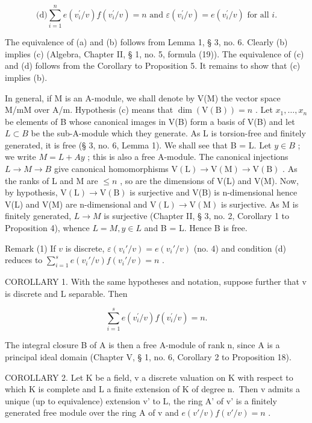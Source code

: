 \[
\text {(d)} \sum_ {i = 1} ^ {n} e (v _ {i} ^ {\prime} / v) f (v _ {i} ^ {\prime} / v) = n \text { and } \varepsilon (v _ {i} ^ {\prime} / v) = e (v _ {i} ^ {\prime} / v) \text { for   all } i.
\]

The equivalence of (a) and (b) follows from Lemma 1, § 3, no. 6. Clearly (b) implies (c) (Algebra, Chapter II, § 1, no. 5, formula (19)). The equivalence of (c) and (d) follows from the Corollary to Proposition 5. It remains to show that (c) implies (b).

In general, if M is an A-module, we shall denote by V(M) the vector space M/mM over A/m. Hypothesis (c) means that \(\dim(\mathrm{V}(\mathrm{B})) = n\) . Let \(x_{1}, \ldots, x_{n}\) be elements of B whose canonical images in V(B) form a basis of V(B) and let \(L \subset B\) be the sub-A-module which they generate. As L is torsion-free and finitely generated, it is free (§ 3, no. 6, Lemma 1). We shall see that B = L. Let \(y \in B\) ; we write \(M = L + Ay\) ; this is also a free A-module. The canonical injections \(L \to M \to B\) give canonical homomorphisms \(\mathrm{V}(\mathrm{L}) \to \mathrm{V}(\mathrm{M}) \to \mathrm{V}(\mathrm{B})\) . As the ranks of L and M are \(\leqslant n\) , so are the dimensions of V(L) and V(M). Now, by hypothesis, \(\mathrm{V}(\mathrm{L}) \to \mathrm{V}(\mathrm{B})\) is surjective and V(B) is n-dimensional hence V(L) and V(M) are n-dimensional and \(\mathrm{V}(\mathrm{L}) \to \mathrm{V}(\mathrm{M})\) is surjective. As M is finitely generated, \(L \to M\) is surjective (Chapter II, § 3, no. 2, Corollary 1 to Proposition 4), whence \(L = M, y \in L\) and B = L. Hence B is free.

Remark (1) If \(v\) is discrete, \(\varepsilon(v_i'/v) = e(v_i'/v)\) (no. 4) and condition (d) reduces to \(\sum_{i=1}^{s} e(v_i'/v)f(v_i'/v) = n\) .

COROLLARY 1. With the same hypotheses and notation, suppose further that v is discrete and L separable. Then

\[
\sum_ {i = 1} ^ {s} e (v _ {i} ^ {\prime} / v) f (v _ {i} ^ {\prime} / v) = n.
\]

The integral closure B of A is then a free A-module of rank n, since A is a principal ideal domain (Chapter V, § 1, no. 6, Corollary 2 to Proposition 18).

COROLLARY 2. Let K be a field, v a discrete valuation on K with respect to which K is complete and L a finite extension of K of degree n.~Then v admits a unique (up to equivalence) extension v' to L, the ring A' of v' is a finitely generated free module over the ring A of v and \(e(v'/v)f(v'/v)=n\) .

